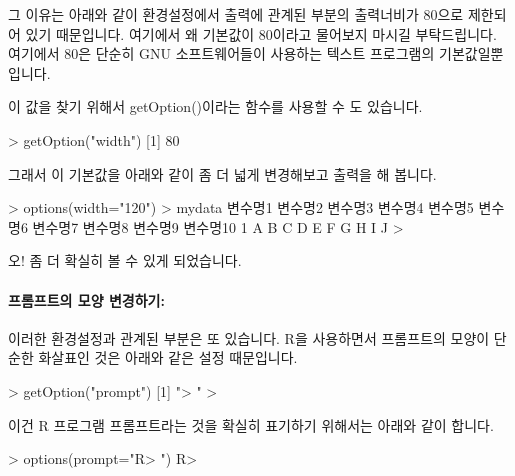 \documentclass[tutorial.tex]{subfiles}
\begin{document}
그 이유는 아래와 같이 환경설정에서 출력에 관계된 부분의 출력너비가 80으로 제한되어 있기 때문입니다. 
여기에서 왜 기본값이 80이라고 물어보지 마시길 부탁드립니다. 
여기에서 80은 단순히 GNU 소프트웨어들이 사용하는 텍스트 프로그램의 기본값일뿐입니다.

\begin{Schunk}
\end{Schunk}

이 값을 찾기 위해서 getOption()이라는 함수를 사용할 수 도 있습니다. 

\begin{Schunk}
\begin{Soutput}
> getOption("width")
[1] 80
\end{Soutput}
\end{Schunk}

그래서 이 기본값을 아래와 같이 좀 더 넓게 변경해보고 출력을 해 봅니다. 

\begin{Schunk}
\begin{Soutput}
> options(width="120")
> mydata
  변수명1 변수명2 변수명3 변수명4 변수명5 변수명6 변수명7 변수명8 변수명9 변수명10
1       A       B       C       D       E       F       G       H       I        J
> 
\end{Soutput}
\end{Schunk}

오! 좀 더 확실히 볼 수 있게 되었습니다. 

\paragraph{프롬프트의 모양 변경하기:}  이러한 환경설정과 관계된 부분은 또 있습니다. 
R을 사용하면서 프롬프트의 모양이 단순한 화살표인 것은 아래와 같은 설정 때문입니다.

\begin{Schunk}
\begin{Soutput}
> getOption("prompt")
[1] "> "
> 
\end{Soutput}
\end{Schunk}

이건 R 프로그램 프롬프트라는 것을 확실히 표기하기 위해서는 아래와 같이 합니다. 

\begin{Schunk}
\begin{Soutput}
> options(prompt="R> ")
R> 
\end{Soutput}
\end{Schunk}
\end{document}
